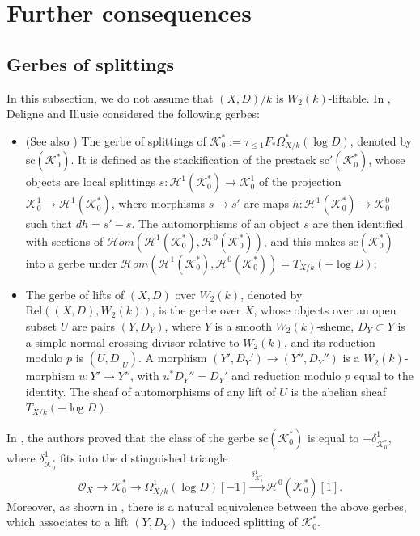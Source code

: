 \documentclass[12pt, a4paper]{article}
\begin{document}
\section{Further consequences}

\iffalse
\subsection{Gerbes of splittings}

In this subsection, we do not assume that $(X,D)/k$ is $W_2(k)$-liftable. In \cite[\S3]{DI}, Deligne and Illusie considered the following gerbes:
\begin{itemize}
    \item (See also \cite[\S3.2]{AS}) The gerbe of splittings of $\mathcal K_0^*:=\tau_{\leq 1}F_*\Omega^*_{X/k}(\log D)$, denoted by $\mathrm{sc}(\mathcal K_0^*)$. It is defined as the stackification of the prestack \(\text{sc}'(\mathcal K_0^*)\), whose objects are local splittings
\( s: \mathcal H^1(\mathcal K_0^*) \to \mathcal K_0^1 \)
of the projection \( \mathcal K_0^1  \to \mathcal H^1(\mathcal K_0^*) \), where morphisms \( s \to s' \) are maps
\( h: \mathcal H^1(\mathcal K_0^*) \to \mathcal K_0^0 \)
such that \( dh = s' - s \). The automorphisms of an object \( s \) are then identified with sections of \( \mathcal Hom(\mathcal H^1(\mathcal K_0^*), \mathcal H^0(\mathcal K_0^*)) \), and this makes \( \text{sc}(\mathcal K_0^*) \) into a gerbe under \(\mathcal Hom(\mathcal H^1(\mathcal K_0^*), \mathcal H^0(\mathcal K_0^*))=T_{X/k}(-\log D)\);
\item The gerbe of lifts of \( (X,D)\) over \( W_2(k) \), denoted by \( \text{Rel}((X,D), W_2(k)) \), is the gerbe over $X$, whose objects over an open subset \( U \) are pairs \( (Y,D_Y) \), where $Y$ is a smooth \( W_2(k) \)-sheme, $D_Y\subset Y$ is a simple normal crossing divisor relative to $W_2(k)$, and its reduction modulo \( p \) is \( (U,D|_U) \). A morphism \( (Y',D_Y') \to (Y'',D_Y'') \) is a $W_2(k)$-morphism $u:Y'\to Y''$, with $u^*D_Y''=D_Y'$ and reduction modulo \( p \) equal to the identity. The sheaf of automorphisms of any lift of \( U \) is the abelian sheaf \( T_{X/k}(-\log D)\).
\end{itemize}
In \cite[Proposition 3.3]{DI}, the authors proved that the class of the gerbe $\mathrm{sc}(\mathcal K_0^*)$ is equal to $-\delta^1_{\mathcal K^*_0}$, where $\delta^1_{\mathcal K^*_0}$ fits into the distinguished triangle 
$$
\mathcal O_X\to\mathcal K_0^*\to\Omega^1_{X/k}(\log D)[-1]\stackrel{\delta^1_{\mathcal K^*_0}}{\to}\mathcal H^0(\mathcal K^*_0)[1].$$
Moreover, as shown in \cite[Th\'eorème 3.5]{DI}, there is a natural equivalence between the above gerbes, which associates to a lift $(Y,D_Y)$ the induced splitting of $\mathcal K_0^*$.
\end{document}

